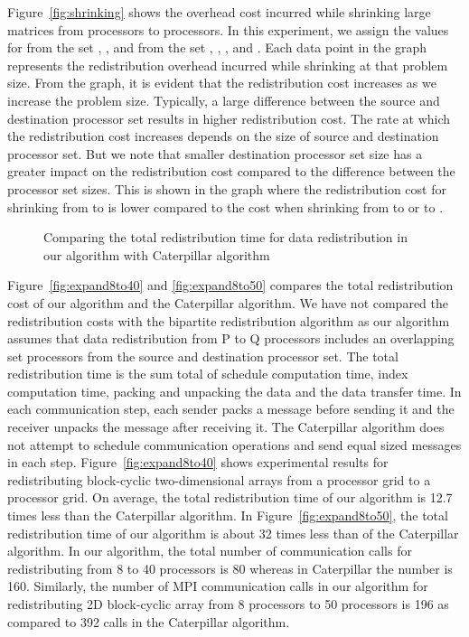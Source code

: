 \documentclass[letterpaper]{llncs}
\begin{document}
\vspace{-0.02in}
Figure~\ref{fig:shrinking} shows the overhead cost incurred while shrinking large matrices from  processors to  processors. In this 
experiment, we assign the values for  from the set , ,  and  from the set , , ,   and .
Each data point in the graph 
represents the redistribution overhead incurred while shrinking at that problem size. From the graph, it is evident that the redistribution 
cost increases as we increase the problem size. Typically, a large difference between the 
source and destination processor set results in higher redistribution cost. The rate at which the redistribution cost increases  depends on the size 
of source and destination processor set. But we note that  smaller destination processor set size 
has a greater impact on the redistribution cost compared to the difference between the processor set sizes.
This is shown in the graph where the redistribution cost for shrinking from  to  is lower compared to the cost  
when shrinking from  to  or  to .
\begin{figure}[th]
\caption{Comparing the total redistribution time for data redistribution in our algorithm with  Caterpillar algorithm}
\end{figure}

\vspace{-0.02in}
Figure~\ref{fig:expand8to40} and \ref{fig:expand8to50} compares  the total redistribution cost of our algorithm and the Caterpillar algorithm. 
We have not compared the redistribution costs with the bipartite redistribution algorithm as our algorithm assumes that data redistribution from 
P to Q processors includes an overlapping set processors from the 
source and destination processor set. 
The total redistribution time is the sum total of schedule computation time, index computation time, 
packing and unpacking the data and the data transfer time.
 In each communication step, each sender packs a message before sending it and the receiver unpacks
the message after receiving it. The Caterpillar algorithm does not attempt to schedule communication operations and send equal sized messages in each step. Figure~\ref{fig:expand8to40} shows experimental results for redistributing block-cyclic two-dimensional arrays from a  processor 
grid to a  processor grid. On average, the total redistribution time of our algorithm is 12.7 times less than the Caterpillar algorithm. 
In Figure~\ref{fig:expand8to50}, the total redistribution time of our algorithm is about 32 times less than  of the Caterpillar algorithm. 
In our algorithm, the total number of communication calls for redistributing from 8 to 40 processors is 80 whereas in Caterpillar the number is 160. Similarly, the number of MPI communication calls in our algorithm for redistributing 2D block-cyclic array from 8 processors to 50 processors is 196 as compared to 392 calls in the Caterpillar algorithm.
\end{document}
